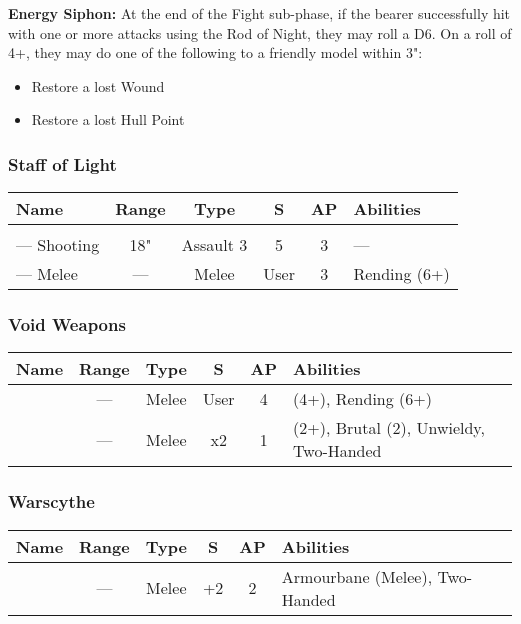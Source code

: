 \vspace*{1em}
\label{Energy Siphon}
\textbf{Energy Siphon:} At the end of the Fight sub-phase, if the bearer successfully hit with one or more attacks using the Rod of Night, they may roll a D6. On a roll of 4+, they may do one of the following to a friendly model within 3":
\begin{itemize}
	\item Restore a lost Wound
	\item Restore a lost Hull Point
\end{itemize}
	

\subsubsection{Staff of Light} \label{Staff of Light}
\noindent
\begin{NiceTabular}{m{130 pt} *{4}{c} >{\raggedright\arraybackslash}p{240pt}}
	Name & Range & Type & S & AP & Abilities \\
	\hline
	 & & &  &  &  \\
	— Shooting & 18" & Assault 3 & 5 & 3 & — \\
	— Melee & — & Melee & User & 3 & Rending (6+) \\
\end{NiceTabular}

\subsubsection{Void Weapons}

\label{Voidblade} \label{Voidscythe}
\noindent
\begin{NiceTabular}{m{130 pt} *{4}{c} >{\raggedright\arraybackslash}p{240pt}}
	Name & Range & Type & S & AP & Abilities \\
	\hline
	 & — & Melee & User & 4 &  (4+), Rending (6+) \\
	  & — & Melee & x2 & 1 &  (2+), Brutal (2), Unwieldy, Two-Handed \\
\end{NiceTabular}

\subsubsection{Warscythe}
\label{Warscythe}
\noindent
\begin{NiceTabular}{m{130 pt} *{4}{c} >{\raggedright\arraybackslash}p{240pt}}
	Name & Range & Type & S & AP & Abilities \\
	\hline
	 & — & Melee & +2 & 2 & Armourbane (Melee), Two-Handed \\
\end{NiceTabular}

